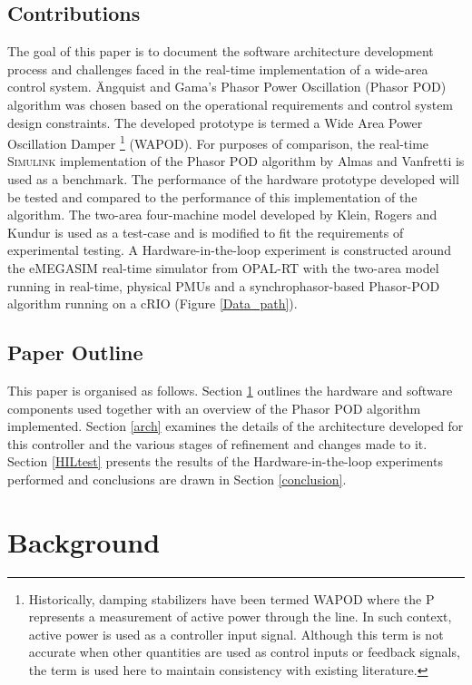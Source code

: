 \documentclass[conference]{IEEEtran}
\begin{document}
\subsection{Contributions}
The goal of this paper is to document the software architecture development process and challenges faced in the real-time implementation of a wide-area control system. \"{A}ngquist and Gama's\cite{PhasorPOD} Phasor Power Oscillation (Phasor POD) algorithm was chosen based on the operational requirements and control system design constraints. The developed prototype is termed a Wide Area Power Oscillation Damper \footnote{Historically, damping stabilizers have been termed WAPOD where the P represents a measurement of active power through the line. In such context, active power is used as a controller input signal. Although this term is not accurate when other quantities are used as control inputs or feedback signals, the term is used here to maintain consistency with existing literature.} (WAPOD). For purposes of comparison, the real-time \textsc{Simulink} implementation of the Phasor POD algorithm by Almas and Vanfretti \cite{PhasorPODImplement} is used as a benchmark. The performance of the hardware prototype developed will be tested and compared to the performance of this implementation of the algorithm. The two-area four-machine model developed by Klein, Rogers and Kundur \cite{KundurTwoArea} is used as a test-case and is modified to fit the requirements of experimental testing. A Hardware-in-the-loop experiment is constructed around the e\textsc{MEGASIM} real-time simulator from OPAL-RT \cite{OPALemegasim} with the two-area model running in real-time, physical PMUs and a synchrophasor-based Phasor-POD algorithm running on a cRIO (Figure \ref{Data_path}).


\subsection{Paper Outline}
This paper is organised as follows. Section \ref{background} outlines the hardware and software components used together with an overview of the Phasor POD algorithm implemented. Section \ref{arch} examines the details of the architecture developed for this controller and the various stages of refinement and changes made to it. Section \ref{HILtest} presents the results of the Hardware-in-the-loop experiments performed and conclusions are drawn in Section \ref{conclusion}.

\section{Background}\label{background}
\end{document}
